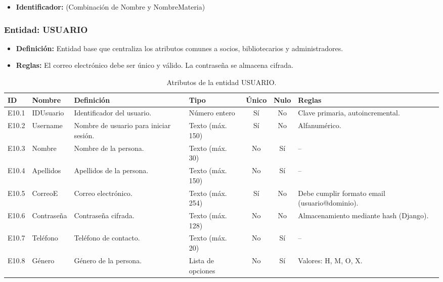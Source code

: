 \begin{itemize}
	\item\textbf{Identificador:} (Combinación de Nombre y NombreMateria)
\end{itemize}

\subsubsection{Entidad: USUARIO}
\begin{itemize}
	\item\textbf{Definición:} Entidad base que centraliza los atributos comunes a socios, bibliotecarios y administradores.
	\item\textbf{Reglas:} El correo electrónico debe ser único y válido. La contraseña se almacena cifrada.
\end{itemize}

\begin{table}[H]
	\centering
	\caption{Atributos de la entidad USUARIO.}
	\label{tab:dict_usuario}
	\small
	\begin{tabularx}{\textwidth}{l l X l c c X}
		\toprule
		\textbf{ID} & \textbf{Nombre} & \textbf{Definición} & \textbf{Tipo} & \textbf{Único} & \textbf{Nulo} & \textbf{Reglas} \\
		\midrule
		E10.1 & IDUsuario & Identificador del usuario. & Número entero & Sí & No & Clave primaria, autoincremental. \\
		\addlinespace
		E10.2 & Username & Nombre de usuario para iniciar sesión. & Texto (máx. 150) & Sí & No & Alfanumérico. \\
		\addlinespace
		E10.3 & Nombre & Nombre de la persona. & Texto (máx. 30) & No & Sí & -- \\
		\addlinespace
		E10.4 & Apellidos & Apellidos de la persona. & Texto (máx. 150) & No & Sí & -- \\
		\addlinespace
		E10.5 & CorreoE & Correo electrónico. & Texto (máx. 254) & Sí & No & Debe cumplir formato email (usuario@dominio). \\
		\addlinespace
		E10.6 & Contraseña & Contraseña cifrada. & Texto (máx. 128) & No & No & Almacenamiento mediante hash (Django). \\
		\addlinespace
		E10.7 & Teléfono & Teléfono de contacto. & Texto (máx. 20) & No & Sí & -- \\
		\addlinespace
		E10.8 & Género & Género de la persona. & Lista de opciones & No & Sí & Valores: H, M, O, X. \\
		\bottomrule
	\end{tabularx}
\end{table}

